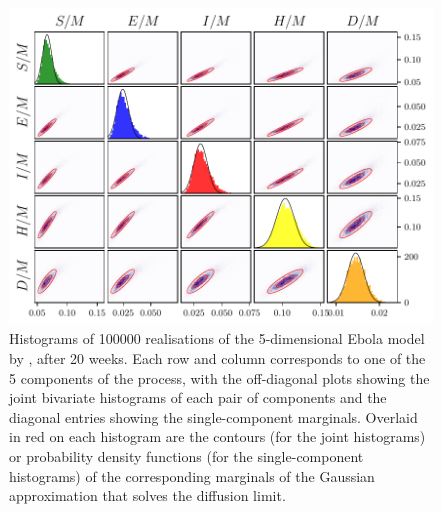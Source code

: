 \begin{landscape}
	\begin{figure}
		\centering
		\includegraphics[width=\textheight]{chp07_outlook/figures/seihfr/seihfr_marginals_gaussian}
		\caption{Histograms of 100000 realisations of the 5-dimensional Ebola model by \citet{LegrandEtAl_2007_UnderstandingDynamicsEbola}, after 20 weeks.
			Each row and column corresponds to one of the 5 components of the process, with the off-diagonal plots showing the joint bivariate histograms of each pair of components and the diagonal entries showing the single-component marginals.
			Overlaid in red on each histogram are the contours (for the joint histograms) or probability density functions (for the single-component histograms) of the corresponding marginals of the Gaussian approximation that solves the diffusion limit.}
		\label{fig:ebola_marginals}
	\end{figure}
\end{landscape}



